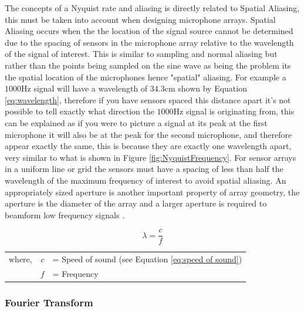 \documentclass{UoNMCHA}
\numberwithin{equation}{section}
\begin{document}
    The concepts of a Nyquist rate and aliasing is directly related to Spatial Aliasing, this must be taken into account when designing microphone arrays. Spatial Aliasing occurs when the the location of the signal source cannot be determined due to the spacing of sensors in the microphone array relative to the wavelength of the signal of interest. This is similar to sampling and normal aliasing but rather than the points being sampled on the sine wave as being the problem its the spatial location of the microphones hence "spatial" aliasing. For example a $1000$Hz signal will have a wavelength of $34.3$cm shown by Equation \ref{eq:wavelength}, therefore if you have sensors spaced this distance apart it's not possible to tell exactly what direction the $1000$Hz signal is originating from, this can be explained as if you were to picture a signal at its peak at the first microphone it will also be at the peak for the second microphone, and therefore appear exactly the same, this is because they are exactly one wavelength apart, very similar to what is shown in Figure \ref{fig:NyquistFrequency}. For sensor arrays in a uniform line or grid the sensors must have a spacing of less than half the wavelength of the maximum frequency of interest to avoid spatial aliasing. An appropriately sized aperture is another important property of array geometry, the aperture is the diameter of the array and a larger aperture is required to beamform low frequency signals \citep{Ami08}.
	
	\begin{equation}
		\lambda = \frac{c}{f}
		\label{eq:wavelength}
	\end{equation}
	\begin{table}[H]
    \centering
        \begin{tabular}{lrl}
            where, & $c$ &= Speed of sound (see Equation \ref{eq:speed of sound}) \\
             & $f$ &= Frequency 
        \end{tabular}
    \end{table}
    
\subsubsection{Fourier Transform} \label{sec:Fourier Transform}
\end{document}
